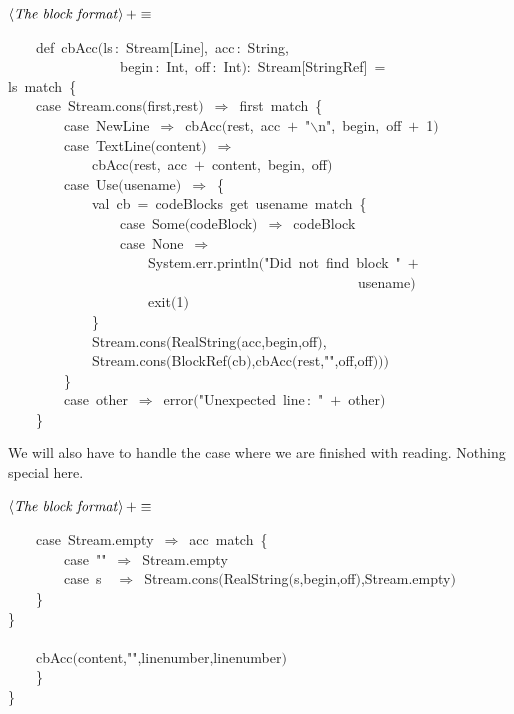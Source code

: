 \documentclass[a4paper,12pt]{article}
\begin{document}
$\left<\mbox{\emph{The block format}}\right>+\equiv$
\begin{program}~~~~{\vem def}~cbAcc$($ls\,{\rm :}~Stream$[$Line$]$,~acc\,{\rm :}~String,
\\~~~~~~~~~~~~~~~~begin\,{\rm :}~Int,~off\,{\rm :}~Int$)${\rm :}~Stream$[$StringRef$]$~=
\\ls~{\vem match}~{\small\{}
\\~~~~{\vem case}~Stream.cons$($first,rest$)$~$\Rightarrow$~first~{\vem match}~{\small\{}
\\~~~~~~~~{\vem case}~NewLine~$\Rightarrow$~cbAcc$($rest,~acc~$+$~"$\backslash$n",~begin,~off~$+$~1$)$
\\~~~~~~~~{\vem case}~TextLine$($content$)$~$\Rightarrow$
\\~~~~~~~~~~~~cbAcc$($rest,~acc~$+$~content,~begin,~off$)$
\\~~~~~~~~{\vem case}~Use$($usename$)$~$\Rightarrow$~{\small\{}
\\~~~~~~~~~~~~{\vem val}~cb~=~codeBlocks~get~usename~{\vem match}~{\small\{}
\\~~~~~~~~~~~~~~~~{\vem case}~Some$($codeBlock$)$~$\Rightarrow$~codeBlock
\\~~~~~~~~~~~~~~~~{\vem case}~None~$\Rightarrow$
\\~~~~~~~~~~~~~~~~~~~~System.err.println$($"Did~not~find~block~"~$+$
\\~~~~~~~~~~~~~~~~~~~~~~~~~~~~~~~~~~~~~~~~~~~~~~~~~~usename$)$
\\~~~~~~~~~~~~~~~~~~~~exit$($1$)$
\\~~~~~~~~~~~~{\small\}}
\\~~~~~~~~~~~~Stream.cons$($RealString$($acc,begin,off$)$,
\\~~~~~~~~~~~~Stream.cons$($BlockRef$($cb$)$,cbAcc$($rest,"",off,off$)$$)$$)$
\\~~~~~~~~{\small\}}
\\~~~~~~~~{\vem case}~other~$\Rightarrow$~error$($"Unexpected~line\,{\rm :}~"~$+$~other$)$
\\~~~~{\small\}}
\\[0.5em]\end{program}


We will also have to handle the case where we are finished with reading.
Nothing special here.

$\left<\mbox{\emph{The block format}}\right>+\equiv$
\begin{program}~~~~{\vem case}~Stream.empty~$\Rightarrow$~acc~{\vem match}~{\small\{}
\\~~~~~~~~{\vem case}~""~$\Rightarrow$~Stream.empty
\\~~~~~~~~{\vem case}~s~~$\Rightarrow$~Stream.cons$($RealString$($s,begin,off$)$,Stream.empty$)$
\\~~~~{\small\}}
\\{\small\}}
\\~~~~~~~~~~~~
\\~~~~cbAcc$($content,"",linenumber,linenumber$)$
\\~~~~{\small\}}
\\{\small\}}
\\[0.5em]\end{program}
\end{document}
